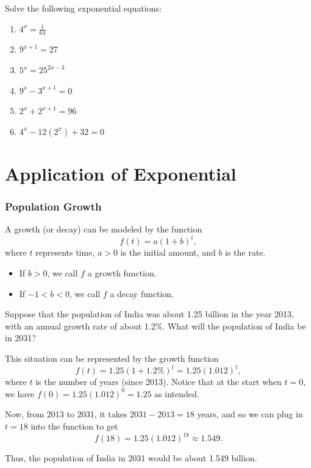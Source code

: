 \begin{frame}
  \begin{exercisebox}{}{}
    Solve the following exponential equations:
    \begin{enumerate}
      \item $4^x = \frac{1}{64}$
      \item $9^{x+1} = 27$
      \item $5^x = 25^{2x-3}$
      \item $9^x - 3^{x+1} = 0$
      \item $2^x + 2^{x+1} = 96$
      \item $4^x - 12(2^x) + 32 = 0$
    \end{enumerate}
  \end{exercisebox}
\end{frame}

\section[Application]{Application of Exponential}
\frame{\sectionpage}

\begin{frame}[t]
  \frametitle{Population Growth}
  \begin{thm}{}{}
    A growth (or decay) can be modeled by the function
    \[ f(t) = a (1+b)^t, \]
    where $t$ represents time, $a > 0$ is the initial amount, and $b$ is the rate.
    \begin{itemize}
      \item If $b>0$, we call $f$ a growth function.
      \item If $-1<b<0$, we call $f$ a decay function.
    \end{itemize}
  \end{thm}
\end{frame}

\begin{frame}[t]
  \begin{ex}
    Suppose that the population of India was about 1.25 billion in the year 2013, with an annual growth rate of about 1.2\%. What will the population of India be in 2031?
  \end{ex}
  \begin{sol}
    This situation can be represented by the growth function
    \[ f(t) = 1.25 (1 + 1.2\%)^t = 1.25(1.012)^t, \]
    where $t$ is the number of years (since 2013). Notice that at the start when $t=0$, we have $f(0) = 1.25 (1.012)^0 = 1.25$ as intended.

    Now, from 2013 to 2031, it takes $2031-2013 = 18$ years, and so we can plug in $t=18$ into the function to get
    \[ f(18) = 1.25 (1.012)^{18} \approx 1.549.\]

    Thus, the population of India in 2031 would be about 1.549 billion.
  \end{sol}
\end{frame}

